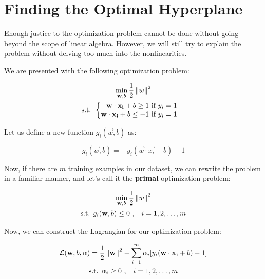 \section{Finding the Optimal Hyperplane}
\label{appendix:optimization}

Enough justice to the optimization problem cannot be done without going beyond the scope of linear algebra. However, we will still try to explain the problem without delving too much into the nonlinearities.

We are presented with the following optimization problem:

\begin{gather}
	\min_{\mathbf{w}, b} \frac{1}{2}\left\lVert w\right\rVert^2 \nonumber\\
	\text{s.t. }
	\begin{cases}
	\begin{aligned}
		\mathbf{w}\cdot\mathbf{x_i} + b \geq 1 \text{ if $y_i = 1$} \nonumber\\
		\mathbf{w}\cdot\mathbf{x_i} + b \leq -1 \text{ if $y_i = 1$} \nonumber
	\end{aligned}
	\end{cases}
\end{gather}

Let us define a new function $g_i(\vec{w}, b)$ as:

\begin{equation}
	g_i(\vec{w}, b) = -y_i(\vec{w}\cdot\vec{x_i} + b) + 1
\end{equation}

Now, if there are $m$ training examples in our dataset, we can rewrite the problem in a familiar manner, and let's call it the \textbf{primal} optimization problem:

\begin{gather}
	\min_{\mathbf{w}, b} \frac{1}{2}\left\lVert w\right\rVert^2 \nonumber\\
	\text{s.t. }
	g_i(\mathbf{w}, b)  \leq 0 \text{ ,}\quad\text{$i = 1, 2, \dots , m$}\nonumber
\end{gather}

Now, we can construct the Lagrangian for our optimization problem:

\begin{gather}
\mathcal{L}(\mathbf{w}, b, \alpha) = \frac{1}{2}\left\lVert\mathbf{w}\right\rVert^2 - \sum_{i = 1}^{m}\alpha_i[y_i(\mathbf{w}\cdot\mathbf{x_i} + b) - 1] \label{eq:lag} \\
\text{s.t. } \alpha_{i} \geq 0\text{ ,}\quad\text{$i = 1, 2, \dots , m$}\nonumber
\end{gather}


